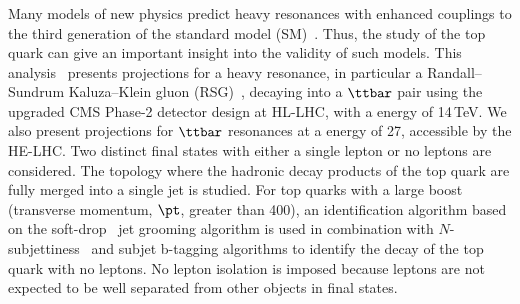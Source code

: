 





\subsubsection{}
%

Many models of new physics predict heavy resonances with enhanced couplings to the third generation of the standard model 
(SM)~\cite{mssm,nsd,nsd2,nsd3,nsd4,littlehiggs,ed,rs1,rs2}. 
Thus, the study of the top quark can give an important insight into the validity of such models.
This analysis~\cite{CMS-PAS-FTR-18-009} presents projections for a heavy resonance, in particular a Randall--Sundrum Kaluza--Klein gluon (RSG)~\cite{rs1}, decaying into a $\ttbar$ pair using the upgraded CMS Phase-2 detector design at HL-LHC, with a \com energy of 14\,TeV. We also present projections for $\ttbar$ resonances at a \com energy of 27\TeV, accessible by the HE-LHC.
Two distinct final states with either a single lepton or no leptons are considered.
The topology where the hadronic decay products of the top quark are fully merged into a single jet is studied. 
For top quarks with a large boost (transverse momentum, $\pt$, greater than 400\GeV), an identification algorithm based on the soft-drop~\cite{softdrop} jet grooming algorithm is used in combination with $N$-subjettiness~\cite{NSUBJETS} and subjet b-tagging algorithms to identify the decay of the top quark with no leptons. No lepton isolation is imposed because leptons are not expected to be well separated from other objects in final states.

